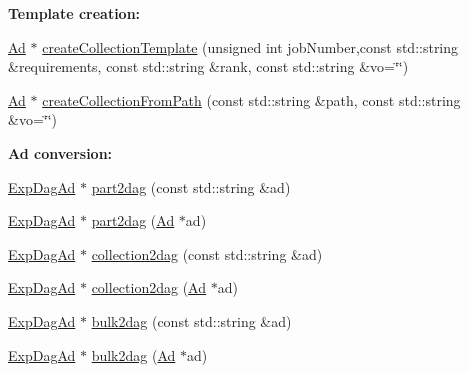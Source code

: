 \begin{Indent}{\bf Template creation:}
\begin{CompactItemize}
\item 
\hyperlink{classglite_1_1wms_1_1jdl_1_1Ad}{Ad} $\ast$ \hyperlink{classglite_1_1wms_1_1jdl_1_1AdConverter_z21_6}{create\-Collection\-Template} (unsigned int job\-Number,const std::string \&requirements, const std::string \&rank, const std::string \&vo=\char`\"{}\char`\"{})
\item 
\hyperlink{classglite_1_1wms_1_1jdl_1_1Ad}{Ad} $\ast$ \hyperlink{classglite_1_1wms_1_1jdl_1_1AdConverter_z21_7}{create\-Collection\-From\-Path} (const std::string \&path, const std::string \&vo=\char`\"{}\char`\"{})
\end{CompactItemize}
\end{Indent}
\begin{Indent}{\bf Ad conversion:}\par
\begin{CompactItemize}
\item 
\hyperlink{classglite_1_1wms_1_1jdl_1_1ExpDagAd}{Exp\-Dag\-Ad} $\ast$ \hyperlink{classglite_1_1wms_1_1jdl_1_1AdConverter_z23_0}{part2dag} (const std::string \&ad)
\item 
\hyperlink{classglite_1_1wms_1_1jdl_1_1ExpDagAd}{Exp\-Dag\-Ad} $\ast$ \hyperlink{classglite_1_1wms_1_1jdl_1_1AdConverter_z23_1}{part2dag} (\hyperlink{classglite_1_1wms_1_1jdl_1_1Ad}{Ad} $\ast$ad)
\item 
\hyperlink{classglite_1_1wms_1_1jdl_1_1ExpDagAd}{Exp\-Dag\-Ad} $\ast$ \hyperlink{classglite_1_1wms_1_1jdl_1_1AdConverter_z23_2}{collection2dag} (const std::string \&ad)
\item 
\hyperlink{classglite_1_1wms_1_1jdl_1_1ExpDagAd}{Exp\-Dag\-Ad} $\ast$ \hyperlink{classglite_1_1wms_1_1jdl_1_1AdConverter_z23_3}{collection2dag} (\hyperlink{classglite_1_1wms_1_1jdl_1_1Ad}{Ad} $\ast$ad)
\item 
\hyperlink{classglite_1_1wms_1_1jdl_1_1ExpDagAd}{Exp\-Dag\-Ad} $\ast$ \hyperlink{classglite_1_1wms_1_1jdl_1_1AdConverter_z23_4}{bulk2dag} (const std::string \&ad)
\item 
\hyperlink{classglite_1_1wms_1_1jdl_1_1ExpDagAd}{Exp\-Dag\-Ad} $\ast$ \hyperlink{classglite_1_1wms_1_1jdl_1_1AdConverter_z23_5}{bulk2dag} (\hyperlink{classglite_1_1wms_1_1jdl_1_1Ad}{Ad} $\ast$ad)
\end{CompactItemize}
\end{Indent}
